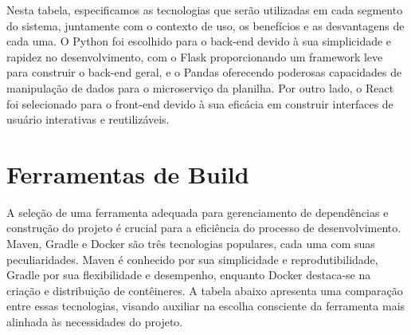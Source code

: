 Nesta tabela, especificamos as tecnologias que serão utilizadas em cada segmento do sistema, juntamente com o contexto de uso, os benefícios e as desvantagens de cada uma. O Python foi escolhido para o back-end devido à sua simplicidade e rapidez no desenvolvimento, com o Flask proporcionando um framework leve para construir o back-end geral, e o Pandas oferecendo poderosas capacidades de manipulação de dados para o microserviço da planilha. Por outro lado, o React foi selecionado para o front-end devido à sua eficácia em construir interfaces de usuário interativas e reutilizáveis.

\section{Ferramentas de Build}
A seleção de uma ferramenta adequada para gerenciamento de dependências e construção do projeto é crucial para a eficiência do processo de desenvolvimento. Maven, Gradle e Docker são três tecnologias populares, cada uma com suas peculiaridades. Maven é conhecido por sua simplicidade e reprodutibilidade, Gradle por sua flexibilidade e desempenho, enquanto Docker destaca-se na criação e distribuição de contêineres. A tabela abaixo apresenta uma comparação entre essas tecnologias, visando auxiliar na escolha consciente da ferramenta mais alinhada às necessidades do projeto.


